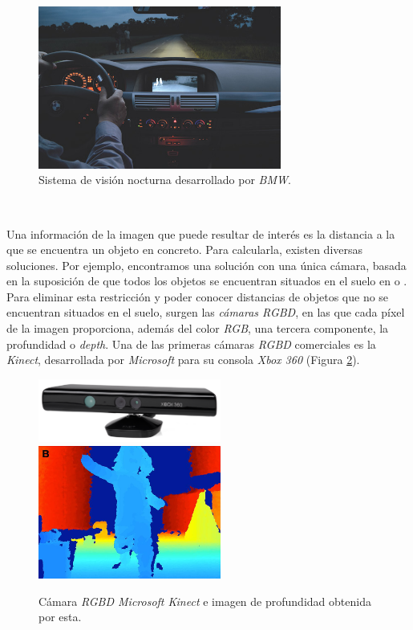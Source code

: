 \begin{figure} [h!]
	\begin{center}
		\includegraphics[width=8cm]{figs/nightvision}
	\end{center}
	\caption{Sistema de visión nocturna desarrollado por \textit{BMW}.}
	\label{fig:nightvision}
\end{figure}\

Una información de la imagen que puede resultar de interés es la distancia a la que se encuentra un objeto en concreto. Para calcularla, existen diversas soluciones. Por ejemplo, encontramos una solución con una única cámara, basada en la suposición de que todos los objetos se encuentran situados en el suelo en \cite{vega19d} o \cite{distanceopencv}. Para eliminar esta restricción y poder conocer distancias de objetos que no se encuentran situados en el suelo, surgen las \textit{cámaras RGBD}, en las que cada píxel de la imagen proporciona, además del color \textit{RGB}, una tercera componente, la profundidad o \textit{depth}. Una de las primeras cámaras \textit{RGBD} comerciales es la \textit{Kinect}, desarrollada por \textit{Microsoft} para su consola \textit{Xbox 360} (Figura \ref{fig:kinect}).\\

\begin{figure} [h!]
	\begin{center}
		\includegraphics[width=6cm]{figs/kinect}\hspace{0.5cm}\includegraphics[width=6cm]{figs/depth}
	\end{center}
	\caption{Cámara \textit{RGBD Microsoft Kinect} e imagen de profundidad obtenida por esta.}
	\label{fig:kinect}
\end{figure}\

